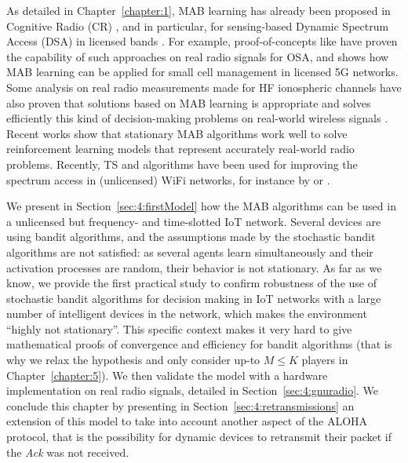 As detailed in Chapter~\ref{chapter:1},
MAB learning has already been proposed in Cognitive Radio (CR) \cite{Mitola99,Haykin05}, and in particular, for sensing-based Dynamic Spectrum Access (DSA) in licensed bands \cite{Jouini10}.
For example,
proof-of-concepts like \cite{kumar2016two} have proven the capability of such approaches on real radio signals for OSA,
and \cite{Maghsudi16} shows how MAB learning can be applied for small cell management in licensed 5G networks.
Some analysis on real radio measurements made for HF ionospheric channels have also proven that solutions based on MAB learning is appropriate and solves efficiently this kind of decision-making problems on real-world wireless signals \cite{Melian15}.
Recent works show that stationary MAB algorithms work well to solve reinforcement learning models that represent accurately real-world radio problems.
Recently, TS and \UCB{} algorithms have been used for improving the spectrum access in (unlicensed) WiFi networks, for instance by \cite{Toldov16} or \cite{Wilhelmi19collaborative,Wilhelmi19potential}.

We present in Section~\ref{sec:4:firstModel} how the MAB algorithms can be used in a unlicensed but frequency- and time-slotted IoT network.
Several devices are using bandit algorithms, and the assumptions made by the stochastic bandit algorithms are not satisfied: as several agents learn simultaneously and their activation processes are random, their behavior is not stationary.
As far as we know, we provide the first practical study to confirm robustness of the use of stochastic bandit algorithms for decision making in IoT networks with a large number of intelligent devices in the network, which makes the environment ``highly not stationary''.
This specific context makes it very hard to give mathematical proofs of  convergence and efficiency for bandit algorithms (that is why we relax the hypothesis and only consider up-to $M \leq K$ players in Chapter~\ref{chapter:5}).
We then validate the model with a hardware implementation on real radio signals, detailed in Section~\ref{sec:4:gnuradio}.
%
We conclude this chapter by presenting in Section~\ref{sec:4:retransmissions} an extension of this model to take into account another aspect of the ALOHA protocol, that is the possibility for dynamic devices to retransmit their packet if the \emph{Ack} was not received.

